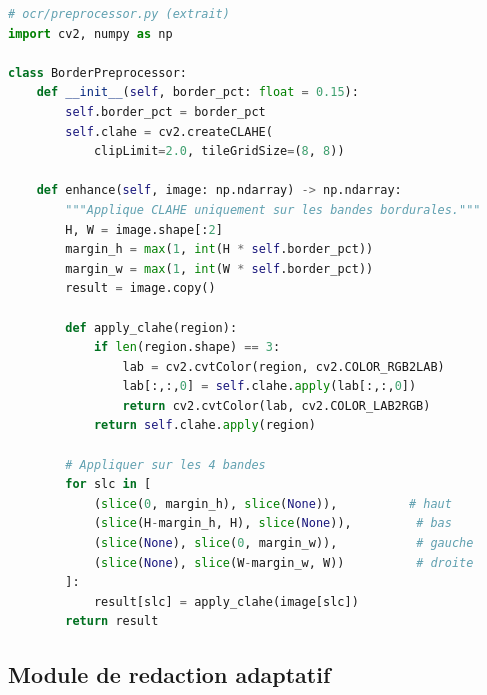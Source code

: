 \begin{lstlisting}[language=Python, caption={BorderPreprocessor -- CLAHE sur les régions bordurales}, label={lst:clahe}]
# ocr/preprocessor.py (extrait)
import cv2, numpy as np

class BorderPreprocessor:
    def __init__(self, border_pct: float = 0.15):
        self.border_pct = border_pct
        self.clahe = cv2.createCLAHE(
            clipLimit=2.0, tileGridSize=(8, 8))

    def enhance(self, image: np.ndarray) -> np.ndarray:
        """Applique CLAHE uniquement sur les bandes bordurales."""
        H, W = image.shape[:2]
        margin_h = max(1, int(H * self.border_pct))
        margin_w = max(1, int(W * self.border_pct))
        result = image.copy()

        def apply_clahe(region):
            if len(region.shape) == 3:
                lab = cv2.cvtColor(region, cv2.COLOR_RGB2LAB)
                lab[:,:,0] = self.clahe.apply(lab[:,:,0])
                return cv2.cvtColor(lab, cv2.COLOR_LAB2RGB)
            return self.clahe.apply(region)

        # Appliquer sur les 4 bandes
        for slc in [
            (slice(0, margin_h), slice(None)),          # haut
            (slice(H-margin_h, H), slice(None)),         # bas
            (slice(None), slice(0, margin_w)),           # gauche
            (slice(None), slice(W-margin_w, W))          # droite
        ]:
            result[slc] = apply_clahe(image[slc])
        return result
\end{lstlisting}

\subsection{Module de redaction adaptatif}

